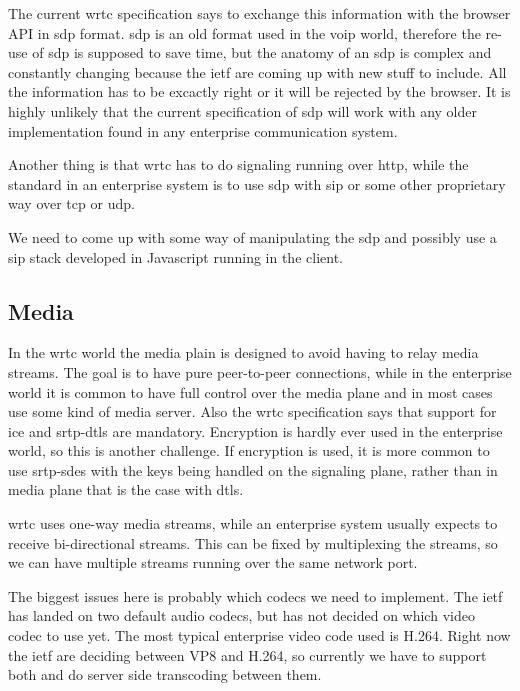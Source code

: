 The current \gls{wrtc} specification says to exchange this information with the browser API in \gls{sdp} format. \gls{sdp} is an old format used in the \gls{voip} world, therefore the re-use of \gls{sdp} is supposed to save time, but the anatomy of an \gls{sdp} is complex and constantly changing because the \gls{ietf} are coming up with new stuff to include. All the information has to be excactly right or it will be rejected by the browser. It is highly unlikely that the current specification of \gls{sdp} will work with any older implementation found in any enterprise communication system.

Another thing is that \gls{wrtc} has to do signaling running over \gls{http}, while the standard in an enterprise system is to use \gls{sdp} with \gls{sip} or some other proprietary way over \gls{tcp} or \gls{udp}.

We need to come up with some way of manipulating the \gls{sdp} and possibly use a \gls{sip} stack developed in Javascript running in the client.

\subsection{Media}
In the \gls{wrtc} world the media plain is designed to avoid having to relay media streams. The goal is to have pure peer-to-peer connections, while in the enterprise world it is common to have full control over the media plane and in most cases use some kind of media server. Also the \gls{wrtc} specification says that support for \gls{ice} and \gls{srtp}-\gls{dtls} are mandatory. Encryption is hardly ever used in the enterprise world, so this is another challenge. If encryption is used, it is more common to use \gls{srtp}-\gls{sdes} with the keys being handled on the signaling plane, rather than in media plane that is the case with \gls{dtls}.

\gls{wrtc} uses one-way media streams, while an enterprise system usually expects to receive bi-directional streams. This can be fixed by multiplexing the streams, so we can have multiple streams running over the same network port.

The biggest issues here is probably which codecs we need to implement. The \gls{ietf} has landed on two default audio codecs, but has not decided on which video codec to use yet. The most typical enterprise video code used is H.264. Right now the \gls{ietf} are deciding between VP8 and H.264, so currently we have to support both and do server side transcoding between them.


